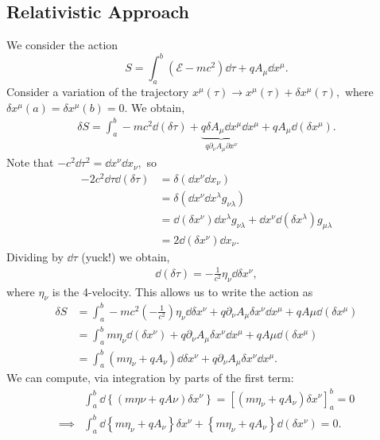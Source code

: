 \documentclass{article}
\numberwithin{equation}{section}
\begin{document}
\subsection{Relativistic Approach}
We consider the action
\begin{equation}
    S = \int_a^b (\mathcal{E} - mc^2)\dd{\tau} + qA_\mu \dd{x}^\mu.
\end{equation}
Consider a variation of the trajectory $x^{\mu}(\tau) \to x^{\mu}(\tau) + \delta x^{\mu}(\tau),$ where $\delta x^{\mu}(a) = \delta x^{\mu}(b) = 0.$ We obtain,
\begin{align}
    \delta S = \int_a ^b -mc^2 \dd{(\delta \tau)} + \underbrace{q \delta A_\mu \dd{x}^\mu}_{q \partial_\nu A_\mu \partial x^\nu}\dd{x}^\mu + q A_\mu \dd{(\delta x^{\mu})}.
\end{align}
Note that $-c^2 \dd{\tau}^2 = \dd{x}^\nu \dd{x}_\nu,$ so
\begin{align}
    -2c^2 \dd{\tau} \dd{(\delta \tau)} &= \delta(\dd{x}^\nu \dd{x}_\nu) \\ 
    &= \delta(\dd{x}^\nu \dd{x}^\lambda g_{\nu\lambda}) \\ 
    &= \dd{(\delta x^\nu)}\dd{x}^\lambda g_{\nu\lambda} + \dd{x}^\nu \dd{(\delta x^\lambda)}g_{\mu\lambda} \\ 
    &= 2\dd{(\delta x^\nu)} \dd{x}_\nu.
\end{align}
Dividing by $\dd{\tau}$ (yuck!) we obtain,
\begin{align}
    \dd{(\delta \tau)} = -\frac{1}{c^2}\eta_\nu \dd{\delta x^\nu},
\end{align}
where $\eta_\nu$ is the 4-velocity. This allows us to write the action as 
\begin{align}
    \delta S &= \int_a^b -mc^2 \left(-\frac{1}{c^2}\right) \eta_\nu \dd{\delta x^\nu} + q\partial_\nu A_\mu \delta x^\nu \dd{x}^\mu + qA\mu \dd{(\delta x^\mu)} \\ 
    &=\int_a^b m \eta_\nu \dd{(\delta x^\nu)} + q\partial_\nu A_\mu \delta x^\nu \dd{x}^\mu + qA\mu \dd{(\delta x^\mu)} \\
    &= \int_a^b (m\eta_\nu + qA_\nu)\dd{\delta x^\nu} + q\partial_\nu A_\mu \delta x^\nu \dd{x}^\mu.
\end{align}
We can compute, via integration by parts of the first term:
\begin{align}
    &\int_a^b \dd{\left\{(m\eta\nu + qA\nu) \delta x^\nu\right\}} = \left[(m\eta_\nu + qA_\nu) \delta x^\nu\right]^{b}_{a} = 0 \\ 
    \implies& \int_a^b \dd{\left\{m\eta_\nu + qA_\nu\right\}}\delta x^{\nu} + \left\{m\eta_\nu + qA_\nu\right\}\dd{(\delta x^\nu)} = 0.
\end{align}
\end{document}
